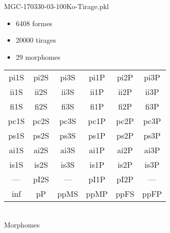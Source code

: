 MGC-170330-03-100Ko-Tirage.pkl
\begin{itemize}
\item 6408 formes
\item 20000 tirages
\item 29 morphomes
\end{itemize}
\begin{center}
\begin{tabular}{cccccc}
\hline
\cellcolor{white}pi1S & \cellcolor{orange}pi2S & \cellcolor{orange}pi3S & \cellcolor{white}pi1P & \cellcolor{white}pi2P & \cellcolor{white}pi3P\\
\cellcolor{brown}ii1S & \cellcolor{brown}ii2S & \cellcolor{brown}ii3S & \cellcolor{white}ii1P & \cellcolor{white}ii2P & \cellcolor{brown}ii3P\\
\cellcolor{yellow}fi1S & \cellcolor{lime}fi2S & \cellcolor{lime}fi3S & \cellcolor{green}fi1P & \cellcolor{white}fi2P & \cellcolor{green}fi3P\\
\cellcolor{yellow}pc1S & \cellcolor{yellow}pc2S & \cellcolor{yellow}pc3S & \cellcolor{white}pc1P & \cellcolor{white}pc2P & \cellcolor{yellow}pc3P\\
\cellcolor{teal}ps1S & \cellcolor{white}ps2S & \cellcolor{teal}ps3S & \cellcolor{white}ps1P & \cellcolor{blue}ps2P & \cellcolor{teal}ps3P\\
\cellcolor{white}ai1S & \cellcolor{lightgray}ai2S & \cellcolor{lightgray}ai3S & \cellcolor{blue}ai1P & \cellcolor{black}ai2P & \cellcolor{white}ai3P\\
\cellcolor{black}is1S & \cellcolor{black}is2S & \cellcolor{lightgray}is3S & \cellcolor{black}is1P & \cellcolor{black}is2P & \cellcolor{pink}is3P\\
--- & \cellcolor{white}pI2S & --- & \cellcolor{white}pI1P & \cellcolor{white}pI2P & ---\\
\cellcolor{white}inf & \cellcolor{white}pP & \cellcolor{white}ppMS & \cellcolor{white}ppMP & \cellcolor{pink}ppFS & \cellcolor{pink}ppFP\\
\hline
\end{tabular}\\
Morphomes
\end{center}
\bigskip

